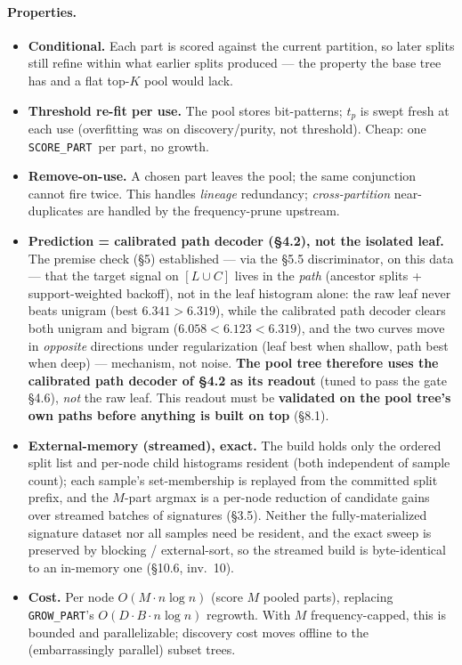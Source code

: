 \documentclass[11pt]{article}
\newcommand{\code}[1]{\texttt{#1}}
\newcommand{\score}{\code{SCORE\_PART}}
\newcommand{\grow}{\code{GROW\_PART}}
\begin{document}
\paragraph{Properties.}
\begin{itemize}[nosep]
\item \textbf{Conditional.} Each part is scored against the current partition, so later splits still refine within what earlier splits produced --- the property the base tree has and a flat top-$K$ pool would lack.
\item \textbf{Threshold re-fit per use.} The pool stores bit-patterns; $t_p$ is swept fresh at each use (overfitting was on discovery/purity, not threshold). Cheap: one \score\ per part, no growth.
\item \textbf{Remove-on-use.} A chosen part leaves the pool; the same conjunction cannot fire twice. This handles \emph{lineage} redundancy; \emph{cross-partition} near-duplicates are handled by the frequency-prune upstream.
\item \textbf{Prediction = calibrated path decoder (\S4.2), not the isolated leaf.} The premise check (\S5) established --- via the \S5.5 discriminator, on this data --- that the target signal on $[L\cup C]$ lives in the \emph{path} (ancestor splits + support-weighted backoff), not in the leaf histogram alone: the raw leaf never beats unigram (best $6.341>6.319$), while the calibrated path decoder clears both unigram and bigram ($6.058<6.123<6.319$), and the two curves move in \emph{opposite} directions under regularization (leaf best when shallow, path best when deep) --- mechanism, not noise. \textbf{The pool tree therefore uses the calibrated path decoder of \S4.2 as its readout} (tuned to pass the gate \S4.6), \emph{not} the raw leaf. This readout must be \textbf{validated on the pool tree's own paths before anything is built on top} (\S8.1).
\item \textbf{External-memory (streamed), exact.} The build holds only the ordered split list and per-node child histograms resident (both independent of sample count); each sample's set-membership is replayed from the committed split prefix, and the $M$-part argmax is a per-node reduction of candidate gains over streamed batches of signatures (\S3.5). Neither the fully-materialized signature dataset nor all samples need be resident, and the exact sweep is preserved by blocking / external-sort, so the streamed build is byte-identical to an in-memory one (\S10.6, inv.~10).
\item \textbf{Cost.} Per node $O(M\cdot n\log n)$ (score $M$ pooled parts), replacing \grow's $O(D\cdot B\cdot n\log n)$ regrowth. With $M$ frequency-capped, this is bounded and parallelizable; discovery cost moves offline to the (embarrassingly parallel) subset trees.
\end{itemize}
\end{document}
